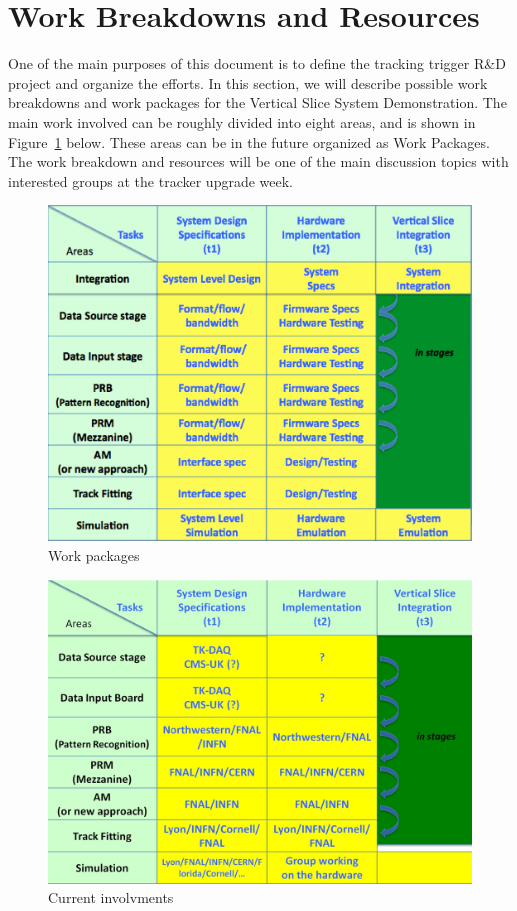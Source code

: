 \section{Work Breakdowns and Resources}

\noindent One of the main purposes of this document is to define the tracking trigger R\&D project and organize the efforts. In this section, we will describe possible work breakdowns and work packages for the Vertical Slice System Demonstration. The main work involved can be roughly divided into eight areas, and is shown in Figure~\ref{fig:WP} below. These areas can be in the future organized as Work Packages. The work breakdown and resources will be one of the main discussion topics with interested groups at the tracker upgrade week.

\begin{figure}[ht!]
\centering
\includegraphics[width=0.7\columnwidth]{Plots/WP.eps}
\caption{Work packages}
\label{fig:WP}
\end{figure}


\begin{figure}[ht!]
\centering
\includegraphics[width=0.7\columnwidth]{Plots/Sharing.eps}
\caption{Current involvments}
\label{fig:Sharing}
\end{figure}


\clearpage
